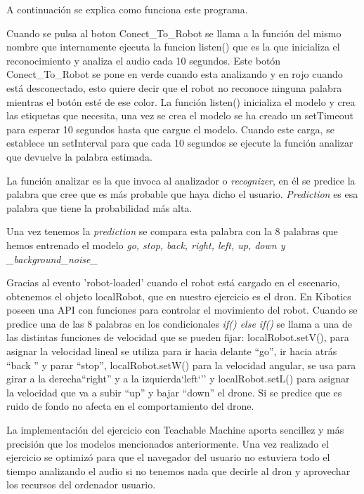 A continuación se explica como funciona este programa.

Cuando se pulsa al boton Conect\_To\_Robot se llama a la función del mismo nombre que internamente ejecuta  la funcion listen() que es la que inicializa el reconocimiento y analiza el audio cada 10 segundos.
Este botón Conect\_To\_Robot  se pone en verde cuando esta analizando y en rojo cuando está desconectado, esto quiere decir que el robot no reconoce ninguna palabra mientras el botón esté de ese color.
La función listen() inicializa el modelo y crea las etiquetas que necesita, una vez se crea el modelo se ha creado un setTimeout para esperar 10 segundos hasta que cargue el modelo. Cuando este carga, se establece un setInterval para que cada 10 segundos se ejecute la función analizar que devuelve la palabra estimada.

La función analizar es la que invoca al analizador o \textit{recognizer}, en él se predice la palabra que cree que es más probable que haya dicho el usuario.  \textit{Prediction} es esa palabra que tiene  la probabilidad más alta.

Una vez tenemos la \textit{prediction} se compara esta palabra con la 8 palabras que hemos entrenado el modelo \textit{go, stop, back, right, left, up, down y \_background\_noise\_}

Gracias al evento 'robot-loaded' cuando el robot está cargado en el escenario,  obtenemos el objeto localRobot, que en nuestro ejercicio es el dron. En Kibotics poseen una API con funciones para controlar el movimiento del robot.  Cuando se predice una de las 8 palabras en los condicionales \textit{if(){} else if() {}}se llama a una de las distintas funciones de velocidad que se pueden fijar: localRobot.setV(), para asignar la velocidad lineal se utiliza para ir hacia delante ``go'', ir hacia atrás ``back '' y parar ``stop'',  localRobot.setW() para la velocidad angular, se usa para girar a la derecha``right'' y a la izquierda`left`'' y  localRobot.setL() para asignar la velocidad que va a subir ``up'' y bajar ``down'' el drone. Si se predice que es ruido de fondo no afecta en el comportamiento del drone.

La implementación del ejercicio con Teachable Machine  aporta sencillez y más precisión que los modelos mencionados anteriormente.
Una vez realizado el ejercicio se optimizó para que el navegador del usuario no estuviera todo el tiempo analizando el  audio si no tenemos nada que decirle al dron y aprovechar  los recursos del ordenador usuario.

